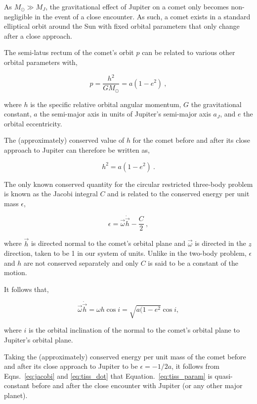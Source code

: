 As $M_\odot \gg M_J$, the gravitational effect of Jupiter on a comet only becomes non-negligible in the event of a close encounter. As such, a comet exists in a standard elliptical orbit around the Sun with fixed orbital parameters that only change after a close approach.

The semi-latus rectum of the comet's orbit $p$ can be related to various other orbital parameters with,

\begin{equation}
    p = \dfrac{h^2}{GM_\odot} = a(1-e^2)~,
\end{equation}

where $h$ is the specific relative orbital angular momentum, $G$ the gravitational constant, $a$ the semi-major axis in units of Jupiter's semi-major axis $a_J$, and $e$ the orbital eccentricity.

The (approximately) conserved value of $h$ for the comet before and after its close approach to Jupiter can therefore be written as,

\begin{equation}
    h^2 = a(1-e^2)~.
\end{equation}

The only known conserved quantity for the circular restricted three-body problem is known as the Jacobi integral $C$ and is related to the conserved energy per unit mass $\epsilon$,

\begin{equation}
    \epsilon = \vec{\omega}\dot\vec{h} - \dfrac{C}{2}~,
    \label{eq:jacobi}
\end{equation}

where $\vec{h}$ is directed normal to the comet's orbital plane and $\vec{\omega}$ is directed in the $z$ direction, taken to be 1 in our system of units. Unlike in the two-body problem, $\epsilon$ and $h$ are not conserved separately and only $C$ is said to be a constant of the motion.

It follows that,

\begin{equation}
    \vec{\omega}\dot\vec{h} = \omega h \cos{i} = \sqrt{a(1-e^2}\cos{i},
    \label{eq:tiss_dot}
\end{equation}

where $i$ is the orbital inclination of the normal to the comet's orbital plane to Jupiter's orbital plane.

Taking the (approximately) conserved energy per unit mass of the comet before and after its close approach to Jupiter to be $\epsilon = -1/2a$, it follows from Eqns.~\eqref{eq:jacobi} and \eqref{eq:tiss_dot} that Equation.~\ref{eq:tiss_param} is quasi-constant before and after the close encounter with Jupiter (or any other major planet). 

